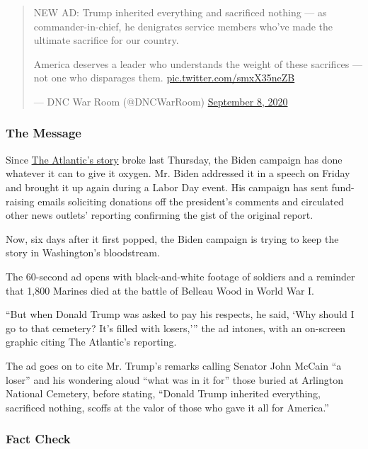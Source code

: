 \begin{quote}
NEW AD: Trump inherited everything and sacrificed nothing --- as
commander-in-chief, he denigrates service members who've made the
ultimate sacrifice for our country.

America deserves a leader who understands the weight of these sacrifices
--- not one who disparages them.
\href{https://t.co/smxX35neZB}{pic.twitter.com/smxX35neZB}

--- DNC War Room (@DNCWarRoom)
\href{https://twitter.com/DNCWarRoom/status/1303427980182654979?ref_src=twsrc\%5Etfw}{September
8, 2020}
\end{quote}

\hypertarget{the-message}{%
\subsubsection{The Message}\label{the-message}}

Since
\href{https://www.theatlantic.com/politics/archive/2020/09/trump-americans-who-died-at-war-are-losers-and-suckers/615997/}{The
Atlantic's story} broke last Thursday, the Biden campaign has done
whatever it can to give it oxygen. Mr. Biden addressed it in a speech on
Friday and brought it up again during a Labor Day event. His campaign
has sent fund-raising emails soliciting donations off the president's
comments and circulated other news outlets' reporting confirming the
gist of the original report.

Now, six days after it first popped, the Biden campaign is trying to
keep the story in Washington's bloodstream.

The 60-second ad opens with black-and-white footage of soldiers and a
reminder that 1,800 Marines died at the battle of Belleau Wood in World
War I.

``But when Donald Trump was asked to pay his respects, he said, `Why
should I go to that cemetery? It's filled with losers,''' the ad
intones, with an on-screen graphic citing The Atlantic's reporting.

The ad goes on to cite Mr. Trump's remarks calling Senator John McCain
``a loser'' and his wondering aloud ``what was in it for'' those buried
at Arlington National Cemetery, before stating, ``Donald Trump inherited
everything, sacrificed nothing, scoffs at the valor of those who gave it
all for America.''

\hypertarget{fact-check}{%
\subsubsection{Fact Check}\label{fact-check}}

